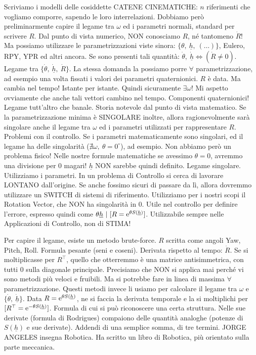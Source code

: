 Scriviamo i modelli delle cosiddette CATENE CINEMATICHE: $n$ riferimenti che vogliamo comporre, sapendo le loro interrelazioni. Dobbiamo però preliminarmente capire il legame tra $\omega$ ed i parametri normali, standard per scrivere $R$. Dal punto di vista numerico, NON conosciamo $R$, né tantomeno $\dot{R}$! Ma possiamo utilizzare le parametrizzazioni viste sinora: $\{\theta,\ \underline{h},\ (\dots)\}$, Eulero, RPY, YPR ed altri ancora. Se sono presenti tali quantità: $\dot{\theta},\ \dot{\underline{h}} \iff (\dot{R}\neq 0)$. Legame tra $\{\dot{\theta},\ \dot{\underline{h}},\ \dot{R}\}$. La stessa domanda la possiamo porre $\forall$ parametrizzazione, ad esempio una volta fissati i valori dei parametri quaternionici. $R$ è data. Ma cambia nel tempo! Istante per istante. Quindi sicuramente $\exists\omega$! Mi aspetto ovviamente che anche tali vettori cambino nel tempo. Componenti quaternionici! Legame tutt'altro che banale. Storia notevole dal punto di vista matematico. Se la parametrizzazione minima è SINGOLARE inoltre, allora ragionevolmente sarà singolare anche il legame tra $\omega$ ed i parametri utilizzati per rappresentare $R$. Problemi con il controllo. Se i parametri matematicamente sono singolari, ed il legame ha delle singolarità ($\nexists\omega,\ \theta=0^{\circ}$), ad esempio. Non abbiamo però un problema fisico! Nelle nostre formule matematiche se avessimo $\theta=0$, avremmo una divisione per 0 magari! $\underline{h}$ NON sarebbe quindi definito. Legame singolare. Utilizziamo i parametri. In un problema di Controllo si cerca di lavorare LONTANO dall'origine. Se anche fossimo sicuri di passare da lì, allora dovremmo utilizzare un SWITCH di sistemi di riferimento. Utilizziamo per i nostri scopi il Rotation Vector, che NON ha singolarità in 0. Utile nel controllo per definire l'errore, espresso quindi come $\theta\underline{h}\ |\ [R=\mathop{}\!\mathrm{e}^{\theta S(\underline{h})}]$. Utilizzabile sempre nelle Applicazioni di Controllo, non di STIMA!

Per capire il legame, esiste un metodo brute-force. $R$ scritta come angoli Yaw, Pitch, Roll. Formula pesante (seni e coseni). Derivata rispetto al tempo: $\dot{R}$. Se si moltiplicasse per $R^\top$, quello che otterremmo è una matrice antisimmetrica, con tutti 0 sulla diagonale principale. Precisiamo che NON si applica mai perché vi sono metodi più veloci e fruibili. Ma si potrebbe fare in linea di massima $\forall$ parametrizzazione. Questi metodi invece li usiamo per calcolare il legame tra $\omega$ e $\{\dot{\theta},\ \dot{\underline{h}}\}$. Data $R=\mathop{}\!\mathrm{e}^{\theta S(\underline{h})}$, ne si faccia la derivata temporale e la si moltiplichi per $[R^\top = \mathop{}\!\mathrm{e}^{-\theta S(\underline{h})}]$. Formula di cui si può riconoscere una certa struttura. Nelle sue derivate (formula di Rodrigues) compaiono delle quantità analoghe (potenze di $S(\underline{h})$ e sue derivate). Addendi di una semplice somma, di tre termini. JORGE ANGELES insegna Robotica. Ha scritto un libro di Robotica, più orientato sulla parte meccanica.

